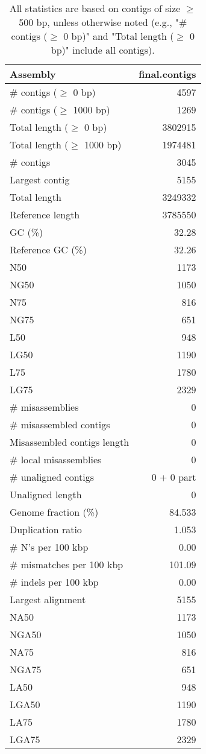 \documentclass[12pt,a4paper]{article}
\begin{document}
\begin{table}[ht]
\begin{center}
\caption{All statistics are based on contigs of size $\geq$ 500 bp, unless otherwise noted (e.g., "\# contigs ($\geq$ 0 bp)" and "Total length ($\geq$ 0 bp)" include all contigs).}
\begin{tabular}{|l*{1}{|r}|}
\hline
Assembly & final.contigs \\ \hline
\# contigs ($\geq$ 0 bp) & 4597 \\ \hline
\# contigs ($\geq$ 1000 bp) & 1269 \\ \hline
Total length ($\geq$ 0 bp) & 3802915 \\ \hline
Total length ($\geq$ 1000 bp) & 1974481 \\ \hline
\# contigs & 3045 \\ \hline
Largest contig & 5155 \\ \hline
Total length & 3249332 \\ \hline
Reference length & 3785550 \\ \hline
GC (\%) & 32.28 \\ \hline
Reference GC (\%) & 32.26 \\ \hline
N50 & 1173 \\ \hline
NG50 & 1050 \\ \hline
N75 & 816 \\ \hline
NG75 & 651 \\ \hline
L50 & 948 \\ \hline
LG50 & 1190 \\ \hline
L75 & 1780 \\ \hline
LG75 & 2329 \\ \hline
\# misassemblies & 0 \\ \hline
\# misassembled contigs & 0 \\ \hline
Misassembled contigs length & 0 \\ \hline
\# local misassemblies & 0 \\ \hline
\# unaligned contigs & 0 + 0 part \\ \hline
Unaligned length & 0 \\ \hline
Genome fraction (\%) & 84.533 \\ \hline
Duplication ratio & 1.053 \\ \hline
\# N's per 100 kbp & 0.00 \\ \hline
\# mismatches per 100 kbp & 101.09 \\ \hline
\# indels per 100 kbp & 0.00 \\ \hline
Largest alignment & 5155 \\ \hline
NA50 & 1173 \\ \hline
NGA50 & 1050 \\ \hline
NA75 & 816 \\ \hline
NGA75 & 651 \\ \hline
LA50 & 948 \\ \hline
LGA50 & 1190 \\ \hline
LA75 & 1780 \\ \hline
LGA75 & 2329 \\ \hline
\end{tabular}
\end{center}
\end{table}
\end{document}
